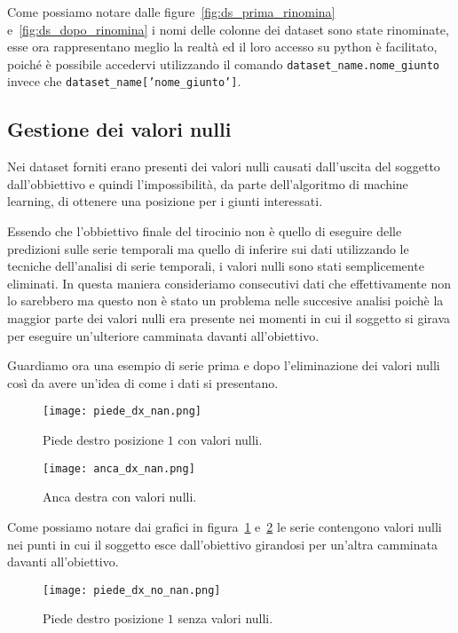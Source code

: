 Come possiamo notare dalle figure~\ref*{fig:ds_prima_rinomina} e~\ref*{fig:ds_dopo_rinomina}
i nomi delle colonne dei dataset sono state rinominate, esse ora rappresentano meglio
la realtà ed il loro accesso su python è facilitato, poiché è possibile accedervi utilizzando
il comando \texttt{dataset\_name.nome\_giunto} invece che \texttt{dataset\_name['nome\_giunto']}.



\subsection{Gestione dei valori nulli}
Nei dataset forniti erano presenti dei valori nulli causati
dall'uscita del soggetto dall'obbiettivo e quindi l'impossibilità, da parte dell'algoritmo
di machine learning, di ottenere una posizione per i giunti interessati.

Essendo che l'obbiettivo finale del tirocinio non è quello di eseguire delle predizioni
sulle serie temporali ma quello di inferire sui dati utilizzando le tecniche
dell'analisi di serie temporali, i valori nulli sono stati semplicemente eliminati.
In questa maniera consideriamo consecutivi dati che effettivamente non lo sarebbero
ma questo non è stato un problema nelle succesive analisi poichè la maggior parte dei 
valori nulli era presente nei momenti in cui il soggetto si girava per eseguire un'ulteriore
camminata davanti all'obiettivo.

Guardiamo ora una esempio di serie prima e dopo l'eliminazione dei valori nulli così da avere
un'idea di come i dati si presentano.

\begin{figure}[H]
    \centering
    \texttt{[image: piede\_dx\_nan.png]}
    \caption{Piede destro posizione $1$ con valori nulli.}
    \label{fig:piede_dx_1_nan}
\end{figure}

\begin{figure}[H]
    \centering
    \texttt{[image: anca\_dx\_nan.png]}
    \caption{Anca destra con valori nulli.}
    \label{fig:anca_dx_nan}
\end{figure}

Come possiamo notare dai grafici in figura~\ref*{fig:piede_dx_1_nan} e~\ref*{fig:anca_dx_nan}
le serie contengono valori nulli nei punti in cui il soggetto esce dall'obiettivo girandosi
per un'altra camminata davanti all'obiettivo.

\begin{figure}[H]
    \centering
    \texttt{[image: piede\_dx\_no\_nan.png]}
    \caption{Piede destro posizione $1$ senza valori nulli.}
    \label{fig:piede_dx_1_no_nan}
\end{figure}

